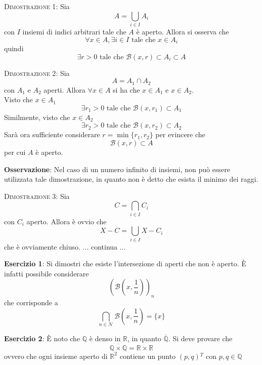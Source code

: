 \documentclass[a4paper]{extarticle}
\begin{document}
\vspace{2em}
\noindent
\normalfont \normalsize
\textsc{Dimostrazione 1}: Sia
\[A=\bigcup_{i \in I} A_i\]
con $I$ insiemi di indici arbitrari tale che $A$ è aperto. Allora si osserva che
\[\forall x \in A, \exists i \in I \text{ tale che } x \in A_i\]
quindi
\[\exists r > 0 \text{ tale che } \mathcal{B}(x,r) \subset A_i \subset A\]

\vspace{2em}
\noindent
\normalfont \normalsize
\textsc{Dimostrazione 2}: Sia
\[A=A_1 \cap A_2\]
con $A_1$ e $A_2$ aperti. Allora $\forall x \in A$ si ha che $x \in A_1$ e $x \in A_2$.\\
Visto che $x \in A_1$
\[\exists r_1 > 0 \text{ tale che } \mathcal{B}(x,r_1) \subset A_1\]
Similmente, visto che $x \in A_2$
\[\exists r_2 > 0 \text{ tale che } \mathcal{B}(x,r_2) \subset A_2\]
Sarà ora sufficiente considerare $r=\min\{r_1,r_2\}$ per evincere che
\[\mathcal{B}(x,r) \subset A\]
per cui $A$ è aperto.

\vspace{1em}
\noindent
\textbf{Osservazione}: Nel caso di un numero infinito di insiemi, non può essere utilizzata tale dimostrazione, in quanto non è detto che esista il minimo dei raggi.

\vspace{2em}
\noindent
\normalfont \normalsize
\textsc{Dimostrazione 3}: Sia
\[C = \bigcap_{i \in I} C_i\]
con $C_i$ aperto. Allora è ovvio che
\[X-C=\bigcup_{i \in I} X - C_i\]
che è ovviamente chiuso.
... continua ...

\vspace{2em}
\noindent
\textbf{Esercizio 1}: Si dimostri che esiste l'intersezione di aperti che non è aperto. È infatti possibile considerare
\[\left(\mathcal{B} \left(x,\frac{1}{n}\right)\right)_n\]
che corrisponde a
\[\bigcap_{n \in \mathcal{N}} \mathcal{B} \left(x,\frac{1}{n}\right) = \{x\}\]

\vspace{2em}
\noindent
\textbf{Esercizio 2}: È noto che $\mathbb{Q}$ è denso in $\mathbb{R}$, in quanto $\overline{\mathbb{Q}}$. Si deve provare che
\[\overline{\mathbb{Q} \times \mathbb{Q}} = \mathbb{R} \times \mathbb{R}\]
ovvero che ogni insieme aperto di $\mathbb{R}^2$ contiene un punto $\left(p,q\right){^T}$ con $p,q \in \mathbb{Q}$
\end{document}
